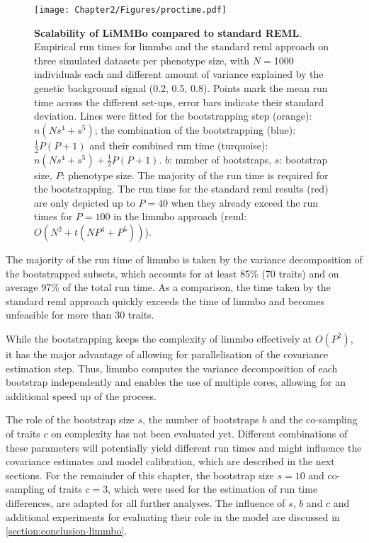 \begin{figure}[H]
	\centering
	\texttt{[image: Chapter2/Figures/proctime.pdf]}
	\caption[\textbf{Scalability of LiMMBo compared to standard REML.}]{\textbf{Scalability of LiMMBo compared to standard REML}. Empirical run times for \gls{limmbo} and the standard \gls{reml} approach on three simulated datasets per phenotype size, with \(N=\)\num{1000} individuals each and different amount of variance explained by the genetic background signal (\num{0.2}, \num{0.5}, \num{0.8}). Points mark the mean run time across the different set-ups, error bars indicate their standard deviation. Lines were fitted for the bootstrapping step (orange): \(n(Ns^4 + s^5)\); the combination of the bootstrapping (blue): \(\frac{1}{2}P(P+1)\) and their combined run time (turquoise):  \(n(Ns^4 + s^5) + \frac{1}{2}P(P+1)\). \(b\): number of bootstraps, \(s\): bootstrap size, \(P\): phenotype size. The majority of the run time is required for the bootstrapping. The run time for the standard \gls{reml} results (red) are only depicted up to \(P=40\) when they already exceed the run times for \(P=100\) in the \gls{limmbo} approach (\gls{reml}: \(O(N^2 + t(NP^4 + P^5))\)).}
	 	\label{fig:proctime}
\end{figure}
%
The majority of the run time of \gls{limmbo} is taken by the variance decomposition of the bootstrapped subsets, which accounts for at least \num{85}\%  (\num{70} traits) and on average \num{97}\%  of the total run time. As a comparison, the time taken by the standard \gls{reml} approach quickly exceeds the time of \gls{limmbo} and becomes unfeasible for more than \num{30} traits. 
 
While the bootstrapping keeps the complexity of \gls{limmbo} effectively at \(O(P^2)\), it has the major advantage of allowing for parallelisation of the covariance estimation step. Thus, \gls{limmbo} computes the variance decomposition of each bootstrap independently and enables the use of multiple cores, allowing for an additional speed up of the process. 

The role of the bootstrap size \(s\),  the number of bootstraps \(b\) and the co-sampling of traits \(c\) on complexity has not been evaluated yet. Different combinations of these parameters will potentially yield different run times and might influence the covariance estimates and model calibration, which are described in the next sections. For the remainder of this chapter, the bootstrap size \(s=10\) and co-sampling of traits \(c=3\), which were used for the estimation of run time differences, are adapted for all further analyses. The influence of \(s\), \(b\) and \(c\) and additional experiments for evaluating their role in the model are discussed in \cref{section:conclusion-limmbo}.

